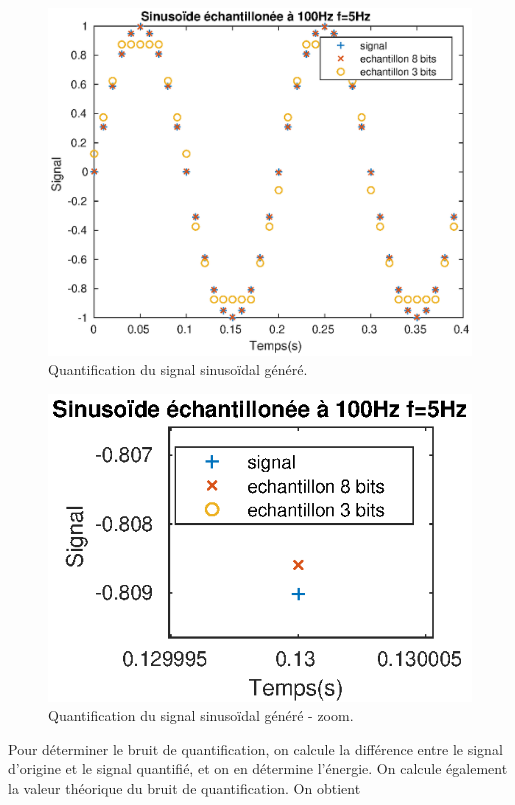 \documentclass[french]{article}
\begin{document}
\begin{figure}[h!]
\centering
\includegraphics{images/signalBruit.eps}
\caption{Quantification du signal sinusoïdal généré.}
\label{signalBruit}
\end{figure}
\begin{figure}[h!]
	\centering
	\includegraphics{images/signalBruit1.eps}
	\caption{Quantification du signal sinusoïdal généré - zoom.}
	\label{signalBruit2}
\end{figure}


Pour déterminer le bruit de quantification, on calcule la différence entre le signal d'origine et le signal quantifié, et on en détermine l'énergie. On calcule également la valeur théorique du bruit de quantification. On obtient
\end{document}

